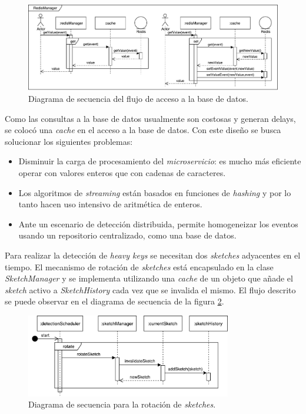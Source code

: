 \documentclass[a4paper,10pt, oneside]{article}
\begin{document}
\begin{figure}[htbp]
	\centering
	\includegraphics[width=1\textwidth]{graph/SecDiag-redisManagerGetValue.pdf}
	\caption{Diagrama de secuencia del flujo de acceso a la base de datos.}
	\label{fig:RedisManagerGetValue}
	
\end{figure}

Como las consultas a la base de datos usualmente son costosas y generan delays, se colocó una \textit{cache} en el acceso a la base de datos. Con este diseño se busca solucionar los siguientes problemas:
\begin{itemize}
	\item Disminuir la carga de procesamiento del \textit{microservicio}: es mucho más eficiente operar con valores enteros que con cadenas de caracteres.
	\item Los algoritmos de \textit{streaming} están basados en funciones de \textit{hashing} y por lo tanto hacen uso intensivo de aritmética de enteros.
	\item Ante un escenario de detección distribuida, permite homogeneizar los eventos usando un repositorio centralizado, como una base de datos.
\end{itemize}


Para realizar la detección de \textit{heavy keys} se necesitan dos \textit{sketches} adyacentes en el tiempo. El mecanismo de rotación de \textit{sketches} está encapsulado en la clase \textit{SketchManager} y se implementa utilizando una \textit{cache} de un objeto que añade el \textit{sketch} activo a \textit{SketchHistory} cada vez que se invalida el mismo. El flujo descrito se puede observar en el diagrama de secuencia de la figura \ref{fig:SecDiagDetectionSchedulerRotation}.

\begin{figure}[htbp]
	\centering
	\includegraphics[width=0.8\textwidth]{graph/SecDiag-detectionSchedulerRotation.pdf}
	\caption{Diagrama de secuencia para la rotación de \textit{sketches}.}
	\label{fig:SecDiagDetectionSchedulerRotation}
\end{figure}
\end{document}
